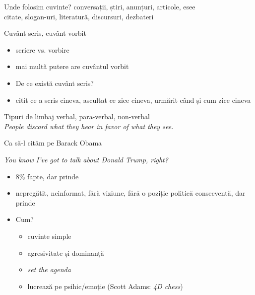 \documentclass{simple}
\begin{document}
\begin{frame}{Unde folosim cuvinte?}
  \centering
  \pause
  conversații, știri, anunțuri, articole, esee\\
  \pause
  \vspace{1cm}
  citate, slogan-uri, literatură, discursuri, dezbateri
\end{frame}

\begin{frame}{Cuvânt scris, cuvânt vorbit}
  \begin{itemize}
    \pause
    \item scriere vs. vorbire
    \pause
    \item mai multă putere are cuvântul vorbit
    \pause
    \item De ce există cuvânt scris?
    \pause
    \item citit ce a scris cineva, ascultat ce zice cineva, urmărit când și cum zice cineva
  \end{itemize}
\end{frame}

\begin{frame}{Tipuri de limbaj}
  \centering
  \pause
  verbal, para-verbal, non-verbal\\
  \pause
  \vspace{0.5cm}
  \textit{People discard what they hear in favor of what they see.}
\end{frame}

\begin{frame}{Ca să-l cităm pe Barack Obama}
  \pause
  \begin{center}
    \textit{You know I've got to talk about Donald Trump, right?}
  \end{center}
  \begin{itemize}
    \pause
    \item 8\% fapte, dar prinde
    \pause
    \item nepregătit, neinformat, fără viziune, fără o poziție politică consecventă, dar prinde
    \pause
    \item Cum?
      \begin{itemize}
        \pause
        \item cuvinte simple
        \pause
        \item agresivitate și dominanță
        \pause
        \item \textit{set the agenda}
        \pause
        \item lucrează pe psihic/emoție (Scott Adams: \textit{4D chess})
      \end{itemize}
  \end{itemize}
\end{frame}
\end{document}
